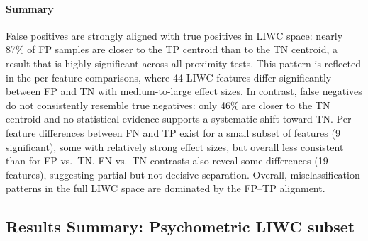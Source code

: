 \paragraph{Summary}
False positives are strongly aligned with true positives in LIWC space: nearly 87\% of FP samples are closer to the TP centroid than to the TN centroid, a result that is highly significant across all proximity tests. This pattern is reflected in the per-feature comparisons, where 44 LIWC features differ significantly between FP and TN with medium-to-large effect sizes. In contrast, false negatives do not consistently resemble true negatives: only 46\% are closer to the TN centroid and no statistical evidence supports a systematic shift toward TN. Per-feature differences between FN and TP exist for a small subset of features (9 significant), some with relatively strong effect sizes, but overall less consistent than for FP vs.\ TN. FN vs.\ TN contrasts also reveal some differences (19 features), suggesting partial but not decisive separation. Overall, misclassification patterns in the full LIWC space are dominated by the FP–TP alignment.





\subsection{Results Summary: Psychometric LIWC subset}

